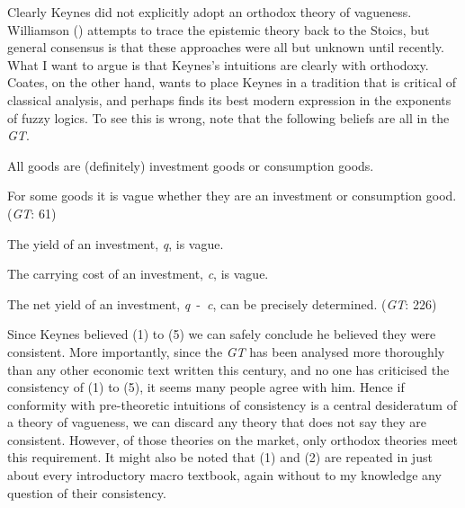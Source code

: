 \documentclass[
  11pt,
  letterpaper,
  DIV=11,
  numbers=noendperiod,
  twoside]{scrartcl}
\providecommand{\tightlist}{%
  \setlength{\itemsep}{0pt}\setlength{\parskip}{0pt}}
\begin{document}
Clearly Keynes did not explicitly adopt an orthodox theory of vagueness.
Williamson () attempts to trace
the epistemic theory back to the Stoics, but general consensus is that
these approaches were all but unknown until recently. What I want to
argue is that Keynes's intuitions are clearly with orthodoxy. Coates, on
the other hand, wants to place Keynes in a tradition that is critical of
classical analysis, and perhaps finds its best modern expression in the
exponents of fuzzy logics. To see this is wrong, note that the following
beliefs are all in the \emph{GT}.

\begin{description}
\tightlist
\item[(1)]
All goods are (definitely) investment goods or consumption goods.
\item[(2)]
For some goods it is vague whether they are an investment or consumption
good. (\emph{GT}: 61)
\item[(3)]
The yield of an investment, \emph{q}, is vague.
\item[(4)]
The carrying cost of an investment, \emph{c}, is vague.
\item[(5)]
The net yield of an investment, \emph{q}~-~\emph{c}, can be precisely
determined. (\emph{GT}: 226)
\end{description}

Since Keynes believed (1) to (5) we can safely conclude he believed they
were consistent. More importantly, since the \emph{GT} has been analysed
more thoroughly than any other economic text written this century, and
no one has criticised the consistency of (1) to (5), it seems many
people agree with him. Hence if conformity with pre-theoretic intuitions
of consistency is a central desideratum of a theory of vagueness, we can
discard any theory that does not say they are consistent. However, of
those theories on the market, only orthodox theories meet this
requirement. It might also be noted that (1) and (2) are repeated in
just about every introductory macro textbook, again without to my
knowledge any question of their consistency.
\end{document}
